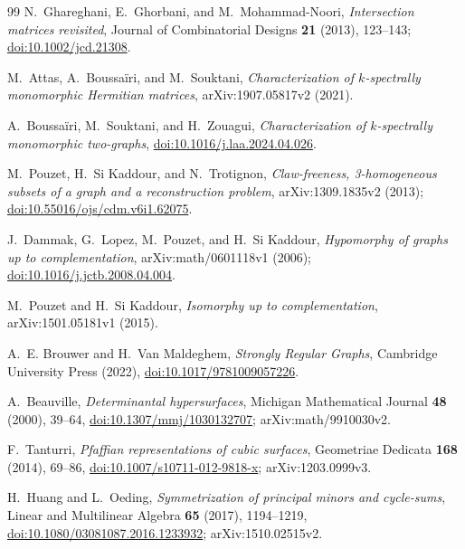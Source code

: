\begin{thebibliography}{99}
N.~Ghareghani, E.~Ghorbani, and M.~Mohammad-Noori,
\emph{Intersection matrices revisited},
Journal of Combinatorial Designs \textbf{21} (2013), 123--143;
\href{https://doi.org/10.1002/jcd.21308}{doi:10.1002/jcd.21308}.

M.~Attas, A.~Boussa\"iri, and M.~Souktani,
\emph{Characterization of \(k\)-spectrally monomorphic Hermitian matrices},
arXiv:1907.05817v2 (2021).

A.~Boussa\"iri, M.~Souktani, and H.~Zouagui,
\emph{Characterization of \(k\)-spectrally monomorphic two-graphs},
\href{https://doi.org/10.1016/j.laa.2024.04.026}
{doi:10.1016/j.laa.2024.04.026}.

M.~Pouzet, H.~Si Kaddour, and N.~Trotignon,
\emph{Claw-freeness, 3-homogeneous subsets of a graph and a reconstruction
problem},
arXiv:1309.1835v2 (2013);
\href{https://doi.org/10.55016/ojs/cdm.v6i1.62075}
{doi:10.55016/ojs/cdm.v6i1.62075}.

J.~Dammak, G.~Lopez, M.~Pouzet, and H.~Si Kaddour,
\emph{Hypomorphy of graphs up to complementation},
arXiv:math/0601118v1 (2006);
\href{https://doi.org/10.1016/j.jctb.2008.04.004}
{doi:10.1016/j.jctb.2008.04.004}.

M.~Pouzet and H.~Si Kaddour,
\emph{Isomorphy up to complementation},
arXiv:1501.05181v1 (2015).

A.~E. Brouwer and H.~Van Maldeghem,
\emph{Strongly Regular Graphs},
Cambridge University Press (2022),
\href{https://doi.org/10.1017/9781009057226}{doi:10.1017/9781009057226}.

A.~Beauville,
\emph{Determinantal hypersurfaces},
Michigan Mathematical Journal \textbf{48} (2000), 39--64,
\href{https://doi.org/10.1307/mmj/1030132707}{doi:10.1307/mmj/1030132707};
arXiv:math/9910030v2.

F.~Tanturri,
\emph{Pfaffian representations of cubic surfaces},
Geometriae Dedicata \textbf{168} (2014), 69--86,
\href{https://doi.org/10.1007/s10711-012-9818-x}{doi:10.1007/s10711-012-9818-x};
arXiv:1203.0999v3.

H.~Huang and L.~Oeding,
\emph{Symmetrization of principal minors and cycle-sums},
Linear and Multilinear Algebra \textbf{65} (2017), 1194--1219,
\href{https://doi.org/10.1080/03081087.2016.1233932}{doi:10.1080/03081087.2016.1233932};
arXiv:1510.02515v2.


\end{thebibliography}

